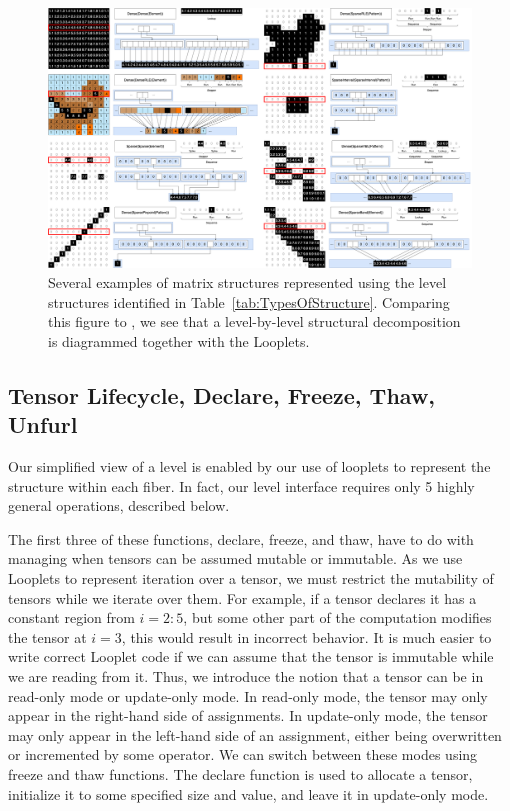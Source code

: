     \begin{figure}
        \centering
        \includegraphics[width=\linewidth]{Structures.png}\hfill%
        \caption{Several examples of matrix structures represented using the
        level structures identified in Table~\ref{tab:TypesOfStructure}.
        Comparing this figure to \cite[Figure 3]{ahrens_looplets_2023}, we see
        that a level-by-level structural decomposition is diagrammed together
        with the Looplets.}
        \label{fig:structuraldiversity}
    \end{figure}

\subsection{Tensor Lifecycle, Declare, Freeze, Thaw, Unfurl}

Our simplified view of a level is enabled by our use of looplets to represent
the structure within each fiber. In fact, our level interface requires only 5
highly general operations, described below.

The first three of these functions, declare, freeze, and thaw, have to do with
managing when tensors can be assumed mutable or immutable. As we use Looplets to
represent iteration over a tensor, we must restrict the mutability of tensors
while we iterate over them. For example, if a tensor declares it has a constant
region from $i = 2:5$, but some other part of the computation modifies the
tensor at $i = 3$, this would result in incorrect behavior. It is much easier to
write correct Looplet code if we can assume that the tensor is immutable while
we are reading from it. Thus, we introduce the notion that a tensor can be in
read-only mode or update-only mode.  In read-only mode, the tensor may only
appear in the right-hand side of assignments. In update-only mode, the tensor
may only appear in the left-hand side of an assignment, either being overwritten
or incremented by some operator.  We can switch between these modes using freeze
and thaw functions. The declare function is used to allocate a tensor,
initialize it to some specified size and value, and leave it in update-only
mode. 

